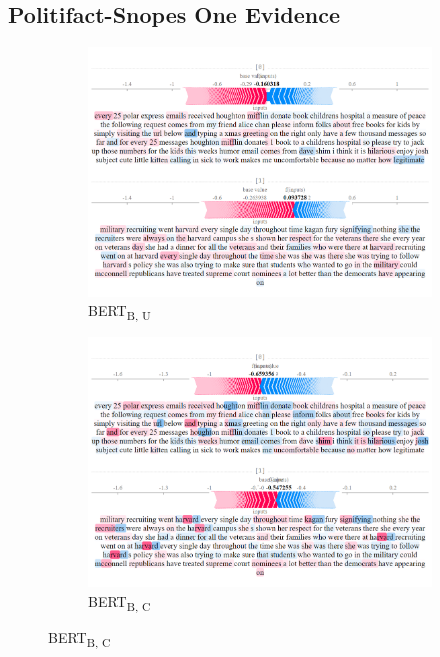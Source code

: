 \subsection{Politifact-Snopes One Evidence}
\label{fig:shap-ps-one-annex}

\begin{figure}[!ht]
    \captionsetup[subfigure]{justification=Centering}
    \begin{subfigure}[t]{0.4\textwidth}
        \includegraphics[width=\textwidth]{figs/one_TF/bert-b-u.png}
        \caption{{BERT}\textsubscript{B, U}}
    \end{subfigure}
    \hspace{\fill} %
    \begin{subfigure}[t]{0.4\textwidth}
        \includegraphics[width=\linewidth]{figs/one_TF/bert-b-c.png}
        \caption{{BERT}\textsubscript{B, C}}
    \end{subfigure}



\end{figure}
